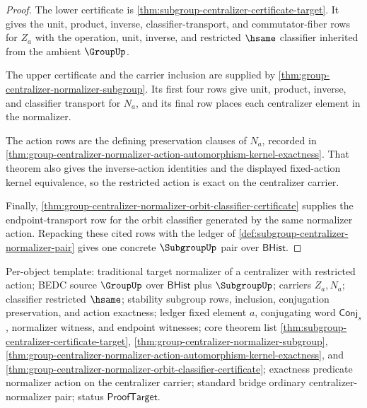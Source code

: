 \begin{proof}
The lower certificate is
\autoref{thm:subgroup-centralizer-certificate-target}. It gives the unit,
product, inverse, classifier-transport, and commutator-fiber rows for $Z_a$
with the operation, unit, inverse, and restricted $\hsame$ classifier inherited
from the ambient $\GroupUp$.

The upper certificate and the carrier inclusion are supplied by
\autoref{thm:group-centralizer-normalizer-subgroup}. Its first four rows give
unit, product, inverse, and classifier transport for $N_a$, and its final row
places each centralizer element in the normalizer.

The action rows are the defining preservation clauses of $N_a$, recorded in
\autoref{thm:group-centralizer-normalizer-action-automorphism-kernel-exactness}.
That theorem also gives the inverse-action identities and the displayed
fixed-action kernel equivalence, so the restricted action is exact on the
centralizer carrier.

Finally,
\autoref{thm:group-centralizer-normalizer-orbit-classifier-certificate}
supplies the endpoint-transport row for the orbit classifier generated by the
same normalizer action. Repacking these cited rows with the ledger of
\autoref{def:subgroup-centralizer-normalizer-pair} gives one concrete
$\SubgroupUp$ pair over $\mathsf{BHist}$.
\end{proof}

Per-object template: traditional target normalizer of a centralizer with
restricted action; BEDC source $\GroupUp$ over $\mathsf{BHist}$ plus
$\SubgroupUp$; carriers $Z_a,N_a$; classifier restricted $\hsame$; stability
subgroup rows, inclusion, conjugation preservation, and action exactness;
ledger fixed element $a$, conjugating word $\mathsf{Conj}_s$, normalizer
witness, and endpoint witnesses; core theorem list
\autoref{thm:subgroup-centralizer-certificate-target},
\autoref{thm:group-centralizer-normalizer-subgroup},
\autoref{thm:group-centralizer-normalizer-action-automorphism-kernel-exactness},
and
\autoref{thm:group-centralizer-normalizer-orbit-classifier-certificate};
exactness predicate normalizer action on the centralizer carrier; standard
bridge ordinary centralizer-normalizer pair; status $\mathsf{ProofTarget}$.
